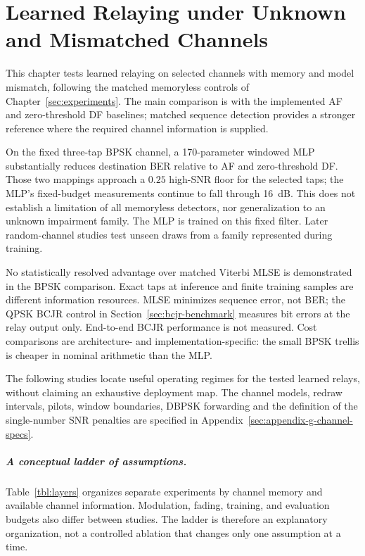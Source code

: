 \chapter{Learned Relaying under Unknown and Mismatched Channels}\label{sec:unknown-channels}

This chapter tests learned relaying on selected channels with memory and model mismatch, following the matched memoryless controls of Chapter~\ref{sec:experiments}. The main comparison is with the implemented AF and zero-threshold DF baselines; matched sequence detection provides a stronger reference where the required channel information is supplied.

On the fixed three-tap BPSK channel, a 170-parameter windowed MLP substantially reduces destination BER relative to AF and zero-threshold DF. Those two mappings approach a $0.25$ high-SNR floor for the selected taps; the MLP's fixed-budget measurements continue to fall through 16~dB. This does not establish a limitation of all memoryless detectors, nor generalization to an unknown impairment family. The MLP is trained on this fixed filter. Later random-channel studies test unseen draws from a family represented during training.

No statistically resolved advantage over matched Viterbi MLSE is demonstrated in the BPSK comparison. Exact taps at inference and finite training samples are different information resources. MLSE minimizes sequence error, not BER; the QPSK BCJR control in Section~\ref{sec:bcjr-benchmark} measures bit errors at the relay output only. End-to-end BCJR performance is not measured. Cost comparisons are architecture- and implementation-specific: the small BPSK trellis is cheaper in nominal arithmetic than the MLP.

The following studies locate useful operating regimes for the tested learned relays, without claiming an exhaustive deployment map. The channel models, redraw intervals, pilots, window boundaries, DBPSK forwarding and the definition of the single-number SNR penalties are specified in Appendix~\ref{sec:appendix-g-channel-specs}.

\paragraph{A conceptual ladder of assumptions.} Table~\ref{tbl:layers} organizes separate experiments by channel memory and available channel information. Modulation, fading, training, and evaluation budgets also differ between studies. The ladder is therefore an explanatory organization, not a controlled ablation that changes only one assumption at a time.

